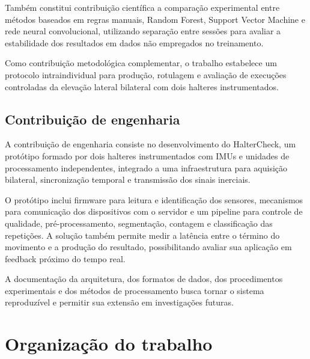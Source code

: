 Também constitui contribuição científica a comparação experimental
entre métodos baseados em regras manuais, Random Forest, Support Vector
Machine e rede neural convolucional, utilizando separação entre sessões
para avaliar a estabilidade dos resultados em dados não empregados no
treinamento.

Como contribuição metodológica complementar, o trabalho estabelece um
protocolo intraindividual para produção, rotulagem e avaliação de
execuções controladas da elevação lateral bilateral com dois halteres
instrumentados.

\subsection{Contribuição de engenharia}
\label{subsec:contribuicao-engenharia}

A contribuição de engenharia consiste no desenvolvimento do HalterCheck,
um protótipo formado por dois halteres instrumentados com IMUs e
unidades de processamento independentes, integrado a uma infraestrutura
para aquisição bilateral, sincronização temporal e transmissão dos
sinais inerciais.

O protótipo inclui firmware para leitura e identificação dos sensores,
mecanismos para comunicação dos dispositivos com o servidor e um
pipeline para controle de qualidade, pré-processamento, segmentação,
contagem e classificação das repetições. A solução também permite medir
a latência entre o término do movimento e a produção do resultado,
possibilitando avaliar sua aplicação em feedback próximo do tempo real.

A documentação da arquitetura, dos formatos de dados, dos procedimentos
experimentais e dos métodos de processamento busca tornar o sistema
reproduzível e permitir sua extensão em investigações futuras.


\section{Organização do trabalho}
